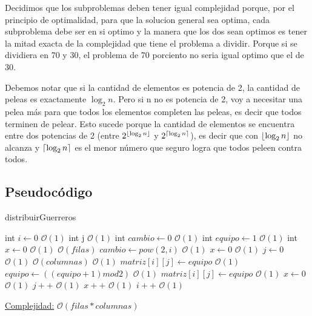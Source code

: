 \documentclass[10pt,a4paper]{article}
\DeclarePairedDelimiter\ceil{\lceil}{\rceil}
\DeclarePairedDelimiter\floor{\lfloor}{\rfloor}
\begin{document}
\par{Decidimos que los subproblemas deben tener igual complejidad porque, por el principio de optimalidad, para que la solucion general sea optima, cada subproblema debe ser en si optimo y la manera que los dos sean optimos es tener la mitad exacta de la complejidad que tiene el problema a dividir. Porque si se dividiera en 70 y 30, el problema de 70 porciento no seria igual optimo que el de 30.}
\par{Debemos notar que si la cantidad de elementos es potencia de 2, la cantidad de peleas es exactamente $\log_2 n$. Pero si n no es potencia de 2, voy a necesitar una pelea más para que todos los elementos completen las peleas, es decir que todos terminen de pelear. Esto sucede porque la cantidad de elementos se encuentra entre dos
potencias de 2 (entre $2^{\floor*{\log_2 n}}$ y $2^{\ceil*{\log_2 n}}$), es decir que con ${\floor*{\log_2 n}}$ no alcanza y ${\ceil*{\log_2 n}}$ es el menor número que seguro logra que todos peleen contra todos.}


\subsection{Pseudocódigo}

\begin{algorithm}
\caption{distribuirGuerreros}
\begin{algorithmic}
	\State int $i \gets 0$ \Comment $\mathcal{O}(1)$
	\State int j \Comment $\mathcal{O}(1)$
	\State int $cambio \gets 0$ \Comment $\mathcal{O}(1)$
	\State int $equipo \gets 1$ \Comment $\mathcal{O}(1)$
	\State int $x \gets 0$ \Comment $\mathcal{O}(1)$
	 \Comment $\mathcal{O}(filas)$
		\State $cambio \gets pow(2,i)$ \Comment $\mathcal{O}(1)$
		\State $x \gets 0$ \Comment $\mathcal{O}(1)$
		\State $j \gets 0$ \Comment $\mathcal{O}(1)$
		 \Comment $\mathcal{O}(columnas)$
			 \Comment $\mathcal{O}(1)$
				\State $matriz[i][j] \gets equipo$ \Comment $\mathcal{O}(1)$
			\Else
				\State $equipo \gets ((equipo +1) mod 2)$ \Comment $\mathcal{O}(1)$
				\State $matriz[i][j] \gets equipo$ \Comment $\mathcal{O}(1)$
				\State $x \gets 0$ \Comment $\mathcal{O}(1)$
			\EndIf
			\State $j++$ \Comment $\mathcal{O}(1)$
			\State $x++$ \Comment $\mathcal{O}(1)$
		\EndWhile
		\State $i++$ \Comment $\mathcal{O}(1)$
	\EndWhile
\EndFunction
\end{algorithmic}
\underline{Complejidad:} $\mathcal{O}(filas*columnas)$\\
\end{algorithm}
\end{document}
